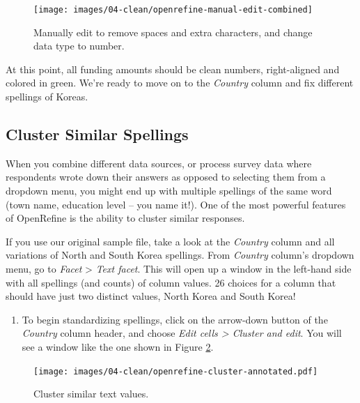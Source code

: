 \documentclass[
  english,
]{book}
\providecommand{\tightlist}{%
  \setlength{\itemsep}{0pt}\setlength{\parskip}{0pt}}
\begin{document}
\begin{figure}
\texttt{[image: images/04-clean/openrefine-manual-edit-combined]} \caption{Manually edit to remove spaces and extra characters, and change data type to number.}\label{fig:openrefine-manual-edit}
\end{figure}

At this point, all funding amounts should be clean numbers, right-aligned and colored in green.
We're ready to move on to the \emph{Country} column and fix different spellings of Koreas.

\hypertarget{cluster-similar-spellings}{%
\subsection*{Cluster Similar Spellings}\label{cluster-similar-spellings}}

When you combine different data sources, or process survey data where respondents
wrote down their answers as opposed to selecting them from a dropdown menu, you might end up
with multiple spellings of the same word (town name, education level -- you name it!).
One of the most powerful features of OpenRefine is the ability to cluster similar responses.

If you use our original sample file, take a look at the \emph{Country} column and
all variations of North and South Korea spellings.
From \emph{Country} column's dropdown menu, go to \emph{Facet} \textgreater{} \emph{Text facet}. This will open up a window
in the left-hand side with all spellings (and counts) of column values. 26 choices for a column
that should have just two distinct values, North Korea and South Korea!

\begin{enumerate}
\def\labelenumi{\arabic{enumi}.}
\tightlist
\item
  To begin standardizing spellings, click on the arrow-down button of the \emph{Country} column header,
  and choose \emph{Edit cells \textgreater{} Cluster and edit}. You will see a window like the one shown in Figure
  \ref{fig:openrefine-cluster}.
\end{enumerate}



\begin{figure}
\centering
\texttt{[image: images/04-clean/openrefine-cluster-annotated.pdf]}
\caption{\label{fig:openrefine-cluster}Cluster similar text values.}
\end{figure}
\end{document}
